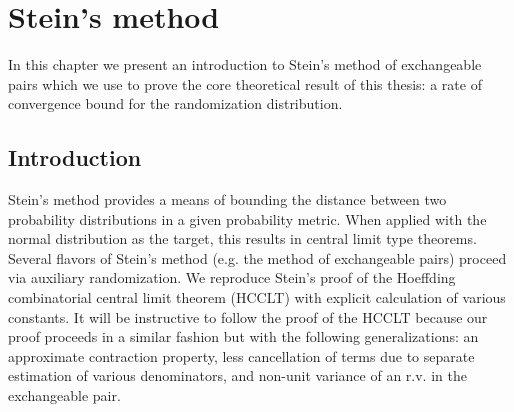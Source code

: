 \chapter{Stein's method}\label{C:steins-method}
In this chapter we present an introduction to Stein's method of exchangeable pairs which we use to
prove the core theoretical result of this thesis: a rate of convergence bound for the randomization
distribution.

\section{Introduction}\label{S:steins-method-introduction}
Stein's method provides a means of bounding the distance between two probability distributions in a
given probability metric.  When applied with the normal distribution as the target, this results in
central limit type theorems.  Several flavors of Stein's method (e.g. the method of exchangeable
pairs) proceed via auxiliary randomization.  We reproduce Stein's proof of the Hoeffding
combinatorial central limit theorem (HCCLT) with explicit calculation of various constants.  It will
be instructive to follow the proof of the HCCLT because our proof proceeds in a similar fashion but
with the following generalizations: an approximate contraction property, less cancellation of terms
due to separate estimation of various denominators, and non-unit variance of an r.v. in the
exchangeable pair.

